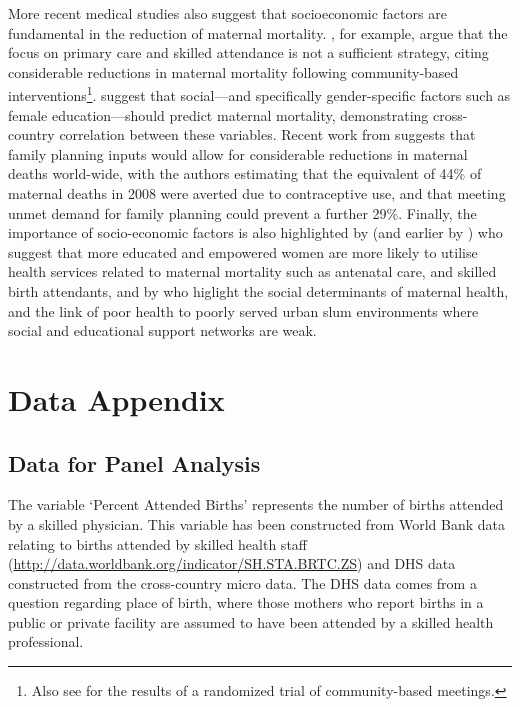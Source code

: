 \documentclass{article}
\begin{document}
\begin{spacing}{1.4}
More recent medical studies also suggest that socioeconomic factors are 
fundamental in the reduction of maternal mortality.  \citet{Costelloetal2004}, 
for example, argue that the focus on primary care and skilled attendance is 
not a sufficient strategy, citing considerable reductions in maternal mortality 
following community-based interventions\footnote{Also see 
\citet{Manandharetal2004} for the results of a randomized trial of 
community-based meetings.}.  \citet{McAlisterBaskett2006} suggest that 
social---and specifically gender-specific factors such as female 
education---should predict maternal mortality, demonstrating cross-country 
correlation between these variables. Recent work from \citet{Ahmedetal2012} 
suggests that family planning inputs would allow for considerable reductions in 
maternal deaths world-wide, with the authors estimating that the equivalent of 
44\% of maternal deaths in 2008 were averted due to contraceptive use, and that 
meeting unmet demand for family planning could prevent a further 29\%. Finally, 
the importance of socio-economic factors is also highlighted by 
\citet{Ahmedetal2010} (and earlier by \citet{ShenWilliamson1999}) who suggest 
that more educated and empowered women are more likely to utilise health 
services related to maternal mortality such as antenatal care, and skilled 
birth attendants, and by \citet{BhuttaBlack2013} who higlight the social 
determinants of maternal health, and the link of poor health to poorly served 
urban slum environments where social and educational support networks are weak.

\section{Data Appendix}
\label{scn:dataappendix}
\subsection{Data for Panel Analysis}
The variable `Percent Attended Births' represents the number of births attended 
by a skilled physician.  This variable has been constructed from World Bank data 
relating to births attended by skilled health staff 
(\url{http://data.worldbank.org/indicator/SH.STA.BRTC.ZS}) and DHS data 
constructed from the cross-country micro data. The DHS data comes from a 
question regarding place of birth, where those mothers who report births in a 
public or private facility are assumed to have been attended by a skilled health 
professional.  


\end{spacing}
\end{document}
